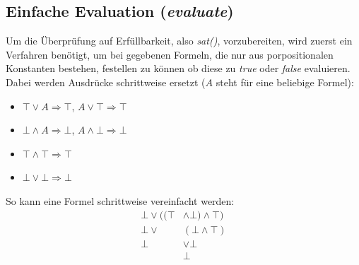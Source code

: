 \documentclass[11pt,a4paper,ngerman]{scrreprt}
\begin{document}
\subsection{Einfache Evaluation (\textit{evaluate})}
Um die Überprüfung auf Erfüllbarkeit, also \textit{sat()}, vorzubereiten, wird zuerst ein Verfahren benötigt, um bei gegebenen Formeln, die nur aus porpositionalen Konstanten bestehen, festellen zu können ob diese zu \textit{true} oder \textit{false} evaluieren. Dabei werden Ausdrücke schrittweise ersetzt ($A$ steht für eine beliebige Formel):
 \begin{itemize}
  \item $\top \vee A \Rightarrow \top$, $A \vee \top \Rightarrow \top$
  \item $\bot \wedge A \Rightarrow \bot$, $A \wedge \bot \Rightarrow \bot$
  \item $\top \wedge \top \Rightarrow \top$
  \item $\bot \vee \bot \Rightarrow \bot$
 \end{itemize}
So kann eine Formel schrittweise vereinfacht werden:
\begin{align}
\bot \vee ( ( \top &\wedge \bot ) \wedge \top ) \\
\bot \vee &( \bot \wedge \top ) \\
\bot &\vee \bot \\
&\bot
\end{align}
\end{document}
